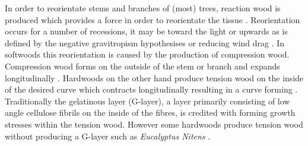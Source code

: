 In order to reorientate stems and branches of (most) trees, reaction wood is
produced which provides a force in order to reorientate the tissue \cite{gardiner2014biology}.
Reorientation occurs for a number of recessions, it may be toward the light or upwards as is defined by the
negative gravitropism hypothesises or reducing wind drag \cite{niklas2012plant}\cite{coutts1995wind}. In softwoods this
reorientation is caused by the production of compression wood. Compression wood
forms on the outside of the stem or branch and expands longitudinally \cite{timell1986compression}. Hardwoods
on the other hand produce tension wood on the inside of the desired curve which
contracts longitudinally resulting in a curve forming \cite{gardiner2014biology}. Traditionally the
gelatinous layer (G-layer), a layer primarily consisting of low angle cellulose
fibrils on the inside of the fibres, is credited with forming growth stresses
within the tension wood. However some hardwoods produce tension wood
without producing a G-layer such as \textit{Eucalyptus Nitens} \cite{walker1993primary}.
